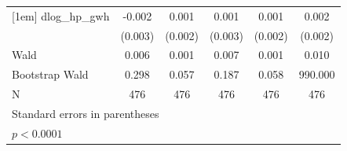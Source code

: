 \begin{table}[htbp]
\begin{tabular}{l*{5}{c}}
[1em]
dlog\_hp\_gwh &      -0.002       &       0.001       &       0.001       &       0.001       &       0.002       \\
            &     (0.003)       &     (0.002)       &     (0.003)       &     (0.002)       &     (0.002)       \\
\hline
Wald        &       0.006       &       0.001       &       0.007       &       0.001       &       0.010       \\
Bootstrap Wald&       0.298       &       0.057       &       0.187       &       0.058       &     990.000       \\
N           &         476       &         476       &         476       &         476       &         476       \\
\hline\hline
\multicolumn{6}{l}{\footnotesize Standard errors in parentheses}\\
\multicolumn{6}{l}{\footnotesize \sym{*} \(p<0.0001\)}\\
\end{tabular}
\end{table}
